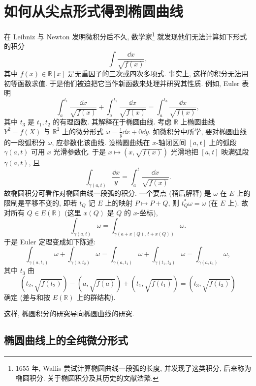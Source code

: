 \section{如何从尖点形式得到椭圆曲线}\label{sec:5.6}

在 Leibniz 与 Newton 发明微积分后不久, 数学家\footnote{1655 年, Wallis 尝试计算椭圆曲线一段弧的长度, 并发现了这类积分, 后来称为椭圆积分. 关于椭圆积分及其历史的文献浩繁.} 就发现他们无法计算如下形式的积分
\[
\int\frac{\dd x}{\sqrt{f(x)}},
\]
其中 $f(x)\in\mathbb{R}[x]$ 是无重因子的三次或四次多项式. 事实上, 这样的积分无法用初等函数求值. 于是他们被迫把它当作新函数来处理并研究其性质. 例如, Euler 表明
\[
\int_{a}^{t_1}\frac{\dd x}{\sqrt{f(x)}} + \int_{a}^{t_2}\frac{\dd x}{\sqrt{f(x)}} = \int_{a}^{t_3}\frac{\dd x}{\sqrt{f(x)}},
\]
其中 $t_3$ 是 $t_1, t_2$ 的有理函数. 其解释在于椭圆曲线. 考虑 $\mathbb{R}$ 上椭圆曲线 $Y^2 = f(X)$ 与 $\mathbb{R}^2$ 上的微分形式 $\omega = \frac{1}{y}\dd x + 0\dd y$. 如微积分中所学, 要对椭圆曲线的一段弧积分 $\omega$, 应参数化该曲线. 设椭圆曲线在 $x$-轴闭区间 $[a, t]$ 上的弧段 $\gamma(a, t)$ 可用 $x$ 光滑参数化. 于是 $x\mapsto(x, \sqrt{f(x)})$ 光滑地把 $[a, t]$ 映满弧段 $\gamma(a, t)$, 且
\[
\int_{\gamma(a, t)}\frac{\dd x}{y} = \int_{a}^{t}\frac{\dd x}{\sqrt{f(x)}}.
\]
故椭圆积分可看作对椭圆曲线一段弧的积分. 一个要点 (稍后解释) 是 $\omega$ 在 $E$ 上的限制是平移不变的, 即若 $t_Q$ 记 $E$ 上的映射 $P\mapsto P + Q$, 则 $t_Q^*\omega = \omega$ (在 $E$ 上). 故对所有 $Q\in E(\mathbb{R})$ (这里 $x(Q)$ 是 $Q$ 的 $x$-坐标),
\[
\int_{\gamma(a, t)}\omega = \int_{\gamma(a+x(Q),\, t+x(Q))}\omega.
\]
于是 Euler 定理变成如下陈述:
\[
\int_{\gamma(a, t_1)}\omega + \int_{\gamma(a, t_2)}\omega = \int_{\gamma(a, t_1)}\omega + \int_{\gamma(t_1, t_3)}\omega = \int_{\gamma(a, t_3)}\omega,
\]
其中 $t_3$ 由
\[
(t_2, \sqrt{f(t_2)}) - (a, \sqrt{f(a)}) + (t_1, \sqrt{f(t_1)}) = (t_3, \sqrt{f(t_3)})
\]
确定 (差与和按 $E(\mathbb{R})$ 上的群结构).

这样, 椭圆积分的研究导向椭圆曲线的研究.

\subsection*{椭圆曲线上的全纯微分形式}

